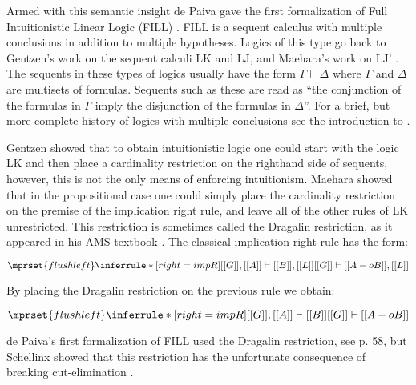 Armed with this semantic insight de Paiva gave the first formalization
of Full Intuitionistic Linear Logic (FILL) \cite{dePaiva:1988}.  FILL
is a sequent calculus with multiple conclusions in addition to
multiple hypotheses.  Logics of this type go back to Gentzen's work on
the sequent calculi LK and LJ, and Maehara's work on LJ'
\cite{Maehara:1954,Takeuti:1975}.  The sequents in these types of
logics usually have the form $\Gamma \vdash \Delta$ where $\Gamma$ and
$\Delta$ are multisets of formulas.  Sequents such as these are read
as ``the conjunction of the formulas in $\Gamma$ imply the disjunction
of the formulas in $\Delta$''.  For a brief, but more complete history
of logics with multiple conclusions see the introduction to
\cite{dePaiva:2005}.

Gentzen showed that to obtain intuitionistic logic one could start
with the logic LK and then place a cardinality restriction on the
righthand side of sequents, however, this is not the only means of
enforcing intuitionism.  Maehara showed that in the propositional case
one could simply place the cardinality restriction on the premise of
the implication right rule, and leave all of the other rules of LK
unrestricted.  This restriction is sometimes called the Dragalin
restriction, as it appeared in his AMS textbook \cite{Dragalin:1988}.
The classical implication right rule has the form:
\begin{center}
  \begin{math}
    $$\mprset{flushleft}
    \inferrule* [right=impR] {
      [[G]], [[A]] \vdash [[B]], [[L]]
    }{[[G]] \vdash [[A -o B]], [[L]]}
  \end{math}
\end{center}
By placing the Dragalin restriction on the previous rule we obtain:
\begin{center}
  \begin{math}
    $$\mprset{flushleft}
    \inferrule* [right=impR] {
      [[G]], [[A]] \vdash [[B]]
    }{[[G]] \vdash [[A -o B]]}
  \end{math}
\end{center}
de Paiva's first formalization of FILL used the Dragalin restriction,
see \cite{dePaiva:1988} p. 58, but Schellinx showed that this restriction has
the unfortunate consequence of breaking cut-elimination
\cite{Schellinx:1991}.

